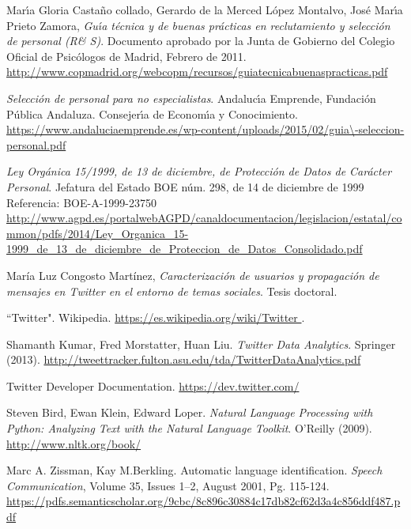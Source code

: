 
\begin{thebibliography}{3}

Mar\'\i a Gloria Casta\~no collado, Gerardo de la Merced L\'opez Montalvo, Jos\'e Mar\'\i a Prieto Zamora,
\textit{Gu\'\i a t\'ecnica y de buenas pr\'acticas en reclutamiento y selecci\'on de personal (R\& S)}.
Documento aprobado por la Junta de Gobierno del Colegio Oficial de Psicólogos de Madrid, Febrero de 2011.
\url{http://www.copmadrid.org/webcopm/recursos/guiatecnicabuenaspracticas.pdf}

\textit{Selecci\'on de personal para no especialistas}.
Andaluc\'\i a Emprende, Fundaci\'on P\'ublica Andaluza. Consejer\'\i a de Econom\'\i a y Conocimiento.
\url{https://www.andaluciaemprende.es/wp-content/uploads/2015/02/guia\-seleccion-personal.pdf}

\textit{Ley Orgánica 15/1999, de 13 de diciembre, de Protección de Datos
de Carácter Personal}.
Jefatura del Estado BOE núm. 298, de 14 de diciembre de 1999
Referencia: BOE-A-1999-23750
\url{http://www.agpd.es/portalwebAGPD/canaldocumentacion/legislacion/estatal/common/pdfs/2014/Ley_Organica_15-1999_de_13_de_diciembre_de_Proteccion_de_Datos_Consolidado.pdf}

María Luz Congosto Martínez,
\textit{Caracterización de usuarios y propagación de mensajes en Twitter en el entorno de temas sociales}.
Tesis doctoral.

``Twitter". Wikipedia. \url{https://es.wikipedia.org/wiki/Twitter }.

Shamanth Kumar, Fred Morstatter, Huan Liu. 
{\em  Twitter Data Analytics}. Springer (2013).
\url{http://tweettracker.fulton.asu.edu/tda/TwitterDataAnalytics.pdf }

 Twitter Developer Documentation. \url{https://dev.twitter.com/}

Steven Bird, Ewan Klein, Edward Loper. {\em Natural Language Processing with Python: 
Analyzing Text with the Natural Language Toolkit}. O'Reilly (2009). \url{http://www.nltk.org/book/}

 Marc A. Zissman, Kay M.Berkling. Automatic language identification. {\em Speech Communication}, Volume 35, Issues 1–2, August 2001, Pg. 115-124.
\url{https://pdfs.semanticscholar.org/9cbc/8c896c30884c17db82cf62d3a4c856ddf487.pdf}


\end{thebibliography}
